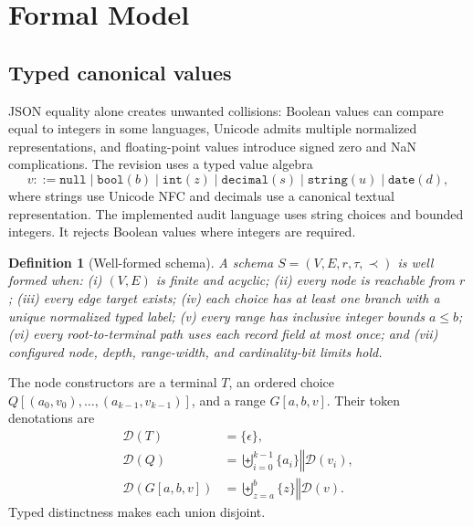\documentclass[10pt]{article}
\newtheorem{definition}{Definition}
\newcommand{\D}{\mathcal{D}}
\begin{document}
\section{Formal Model}
\subsection{Typed canonical values}
JSON equality alone creates unwanted collisions: Boolean values can compare equal to integers in some languages, Unicode admits multiple normalized representations, and floating-point values introduce signed zero and NaN complications. The revision uses a typed value algebra
\begin{equation}
 v ::= \texttt{null}\mid \texttt{bool}(b)\mid \texttt{int}(z)\mid
 \texttt{decimal}(s)\mid \texttt{string}(u)\mid \texttt{date}(d),
\end{equation}
where strings use Unicode NFC and decimals use a canonical textual representation. The implemented audit language uses string choices and bounded integers. It rejects Boolean values where integers are required.

\begin{definition}[Well-formed schema]
A schema \(S=(V,E,r,\tau,\prec)\) is well formed when: (i) \((V,E)\) is finite and acyclic; (ii) every node is reachable from \(r\); (iii) every edge target exists; (iv) each choice has at least one branch with a unique normalized typed label; (v) every range has inclusive integer bounds \(a\le b\); (vi) every root-to-terminal path uses each record field at most once; and (vii) configured node, depth, range-width, and cardinality-bit limits hold.
\end{definition}

The node constructors are a terminal \(T\), an ordered choice
\(Q[(a_0,v_0),\ldots,(a_{k-1},v_{k-1})]\), and a range \(G[a,b,v]\). Their token denotations are
\begin{align}
\D(T) &= \{\epsilon\},\\
\D(Q) &= \biguplus_{i=0}^{k-1} \{a_i\}\mathbin\Vert \D(v_i),\\
\D(G[a,b,v]) &= \biguplus_{z=a}^{b} \{z\}\mathbin\Vert \D(v).
\end{align}
Typed distinctness makes each union disjoint.
\end{document}
